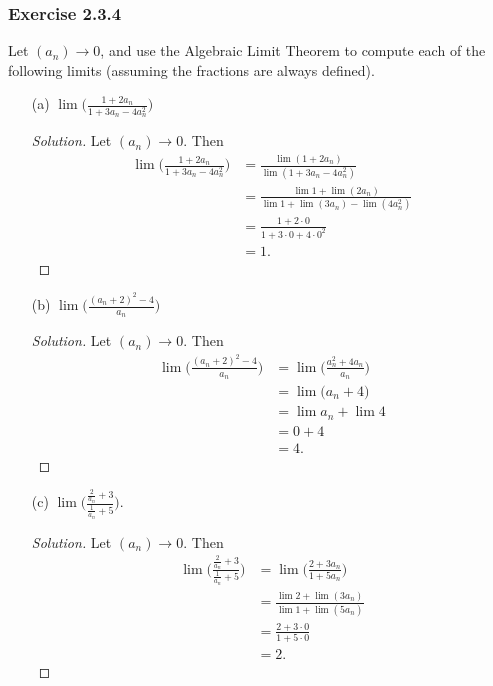 \subsubsection{Exercise 2.3.4}
Let \( (a_n) \to 0\), and use the Algebraic Limit Theorem to compute each of the following limits (assuming the fractions are always defined).
\begin{enumerate}
    \item[(a)] \( \lim \Big( \frac{1 + 2a_n}{ 1 + 3a_n - 4a_n^2}   \Big) \)
        \begin{proof}[Solution]
        Let \( (a_n) \to 0\). Then
        \begin{align*}
            \lim \Big( \frac{ 1 + 2a_n}{ 1 + 3a_n - 4a_n^2 } \Big) &= \frac{ \lim (1 + 2a_n)}{ \lim (1 + 3a_n - 4a_n^2)} \\
                                 &= \frac{ \lim 1 + \lim (2a_n)}{ \lim 1 + \lim (3a_n) - \lim (4a_n^2)} \\
                                 &= \frac{ 1 + 2 \cdot 0}{ 1 + 3 \cdot 0 + 4 \cdot 0^2} \\
                                 &= 1.
        \end{align*}
        \end{proof}
    \item[(b)] \( \lim \Big( \frac{ (a_n + 2)^2 - 4}{a_n} \Big)\)
        \begin{proof}[Solution]
        Let \( (a_n) \to 0\). Then 
        \begin{align*}
          \lim  \Big( \frac{ (a_n + 2)^2 - 4}{ a_n} \Big)&= \lim \Big( \frac{a_n^2 + 4a_n}{a_n} \Big) \\
                                                 &= \lim \Big( a_n + 4 \Big) \\  
                                                 &= \lim a_n + \lim 4 \\ 
                                                 &= 0 + 4 \\ 
                                                 &= 4.
        \end{align*}
        \end{proof}
    \item[(c)] \( \lim \Big( \frac{ \frac{2}{a_n} + 3}{ \frac{1}{a_n} + 5} \Big)\).
        \begin{proof}[Solution]
        Let \( (a_n) \to 0\). Then 
        \begin{align*}
        \lim \Big( \frac{ \frac{2}{a_n} + 3}{ \frac{1}{a_n} + 5} \Big) &= \lim \Big( \frac{2 + 3a_n}{1 + 5a_n} \Big)  \\
                                                               &= \frac{ \lim 2 + \lim (3a_n)}{ \lim 1 + \lim (5a_n)} \\ 
                                                               &= \frac{2 + 3 \cdot 0}{ 1 + 5 \cdot 0}\\
                                                               &=2. 
        \end{align*}
        \end{proof}
\end{enumerate}

